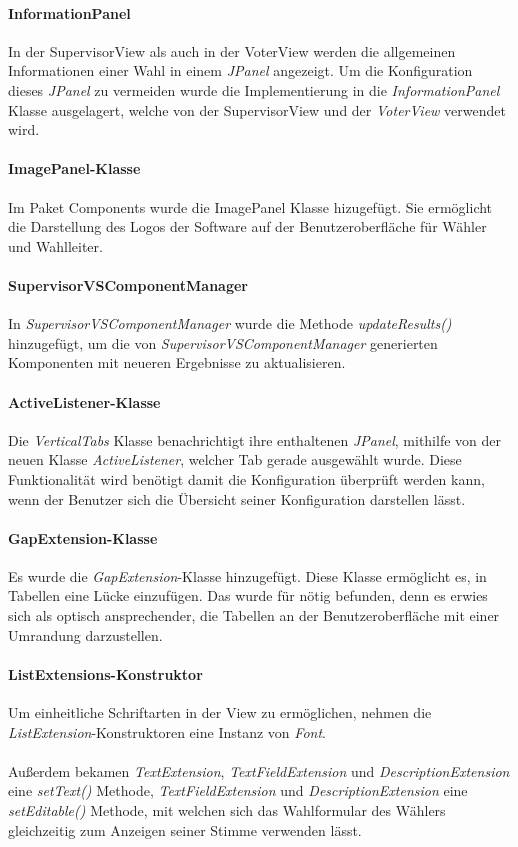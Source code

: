 \documentclass[parskip=full]{scrartcl}
\begin{document}
\paragraph{InformationPanel}
In der SupervisorView als auch in der VoterView werden die allgemeinen Informationen einer Wahl in einem \textit{JPanel} angezeigt. Um die Konfiguration dieses \textit{JPanel} zu vermeiden wurde die Implementierung in die \textit{InformationPanel} Klasse ausgelagert, welche von der SupervisorView und der \textit{VoterView} verwendet wird.

\paragraph{ImagePanel-Klasse}
Im Paket Components wurde die ImagePanel Klasse hizugefügt. Sie ermöglicht die Darstellung des Logos der Software auf der Benutzeroberfläche für Wähler und Wahlleiter. 

\paragraph{SupervisorVSComponentManager}
In \textit{SupervisorVSComponentManager} wurde die Methode \textit{updateResults()} hinzugefügt, um die von \textit{SupervisorVSComponentManager} generierten Komponenten mit neueren Ergebnisse zu aktualisieren.

\paragraph{ActiveListener-Klasse}
Die \textit{VerticalTabs} Klasse benachrichtigt ihre enthaltenen \textit{JPanel}, mithilfe von der neuen Klasse \textit{ActiveListener}, welcher Tab gerade ausgewählt wurde. Diese Funktionalität wird benötigt damit die Konfiguration überprüft werden kann, wenn der Benutzer sich die Übersicht seiner Konfiguration darstellen lässt. 

\paragraph{GapExtension-Klasse}
Es wurde die \textit{GapExtension}-Klasse hinzugefügt. Diese Klasse ermöglicht es, in Tabellen eine Lücke einzufügen. Das wurde für nötig befunden, denn es erwies sich als optisch ansprechender, die Tabellen an der Benutzeroberfläche mit einer Umrandung darzustellen.

\paragraph{ListExtensions-Konstruktor}
Um einheitliche Schriftarten in der View zu ermöglichen, nehmen die \textit{ListExtension}-Konstruktoren eine Instanz von \textit{Font}.
\\
\\
Außerdem bekamen \textit{TextExtension}, \textit{TextFieldExtension} und \textit{DescriptionExtension} eine \textit{setText()} Methode, \textit{TextFieldExtension} und \textit{DescriptionExtension} eine \textit{setEditable()} Methode, mit welchen sich das Wahlformular des Wählers gleichzeitig zum Anzeigen seiner Stimme verwenden lässt.
\end{document}
